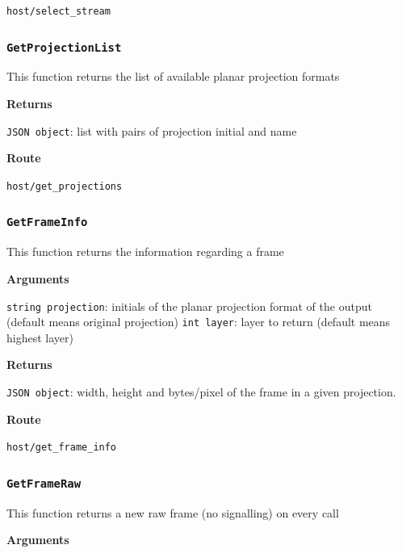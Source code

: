 \documentclass{article}
\begin{document}
\texttt{host/select_stream}


\subsubsection*{\texttt{GetProjectionList}}

This function returns the list of available planar projection formats

\textbf{Returns}

\texttt{JSON object}: list with pairs of projection initial and name

\textbf{Route}

\texttt{host/get_projections}



\subsubsection*{\texttt{GetFrameInfo}}

This function returns the information regarding a frame

\textbf{Arguments}

\texttt{string projection}: initials of the planar projection format of the output (default means original projection)
\texttt{int layer}: layer to return (default means highest layer)

\textbf{Returns}

\texttt{JSON object}:  width, height and bytes/pixel of the frame in a given projection.

\textbf{Route}

\texttt{host/get_frame_info}


\subsubsection*{\texttt{GetFrameRaw}}

This function returns a new raw frame (no signalling) on every call

\textbf{Arguments}
\end{document}
